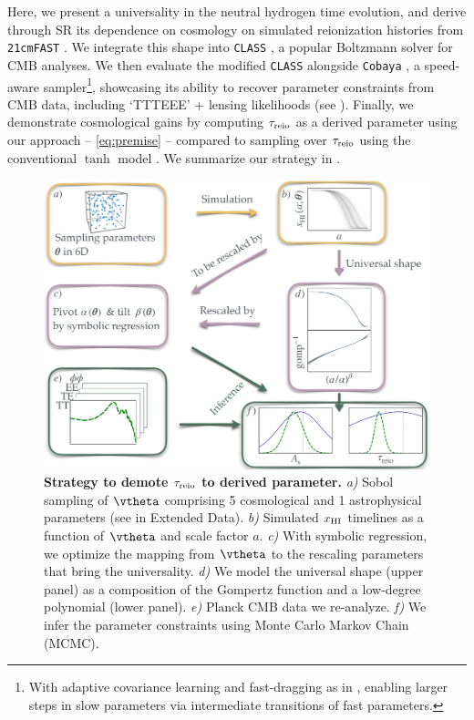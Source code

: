 Here, we present a universality in the neutral hydrogen time evolution,
and derive through SR its dependence on cosmology on simulated
reionization histories from \texttt{21cmFAST} \cite{MesingerEtAl2011,
Murray2020}.
We integrate this shape into \texttt{CLASS} \cite{Blas2011}, a popular
Boltzmann solver for CMB analyses.
We then evaluate the modified \texttt{CLASS} alongside \texttt{Cobaya}
\cite{Torrado2020}, a speed-aware sampler\cite{Lewis2002,
Lewis2013}\footnote{With adaptive covariance learning and fast-dragging
as in \cite{Neal2005}, enabling larger steps in slow parameters via
intermediate transitions of fast parameters.}, showcasing its ability to
recover parameter constraints from CMB data, including `TTTEEE' +
lensing likelihoods \cite{Planck2020c, Planck2020d} (see ).
Finally, we demonstrate cosmological gains by computing $\tau_{\mathrm{reio}}$ as
a derived parameter using our approach -- \cref{eq:premise} --
compared to sampling over $\tau_{\mathrm{reio}}$ using the conventional $\tanh$
model \cite{Lewis2008}.
We summarize our strategy in .

\begin{figure}[tb]
\centering
\includegraphics[width=\linewidth]{figs/big_fig.pdf}
\caption{\textbf{Strategy to demote $\tau_{\mathrm{reio}}$ to derived parameter.}
\emph{a)} Sobol sampling of $\vtheta$ comprising 5 cosmological and 1
astrophysical parameters (see  in Extended Data).
\emph{b)} Simulated $x_{\mathrm{HI}}$ timelines as a function of $\vtheta$ and
scale factor $a$.
\emph{c)} With symbolic regression, we optimize the mapping from
$\vtheta$ to the rescaling parameters that bring the universality.
\emph{d)} We model the universal shape (upper panel) as a composition of
the Gompertz function and a low-degree polynomial (lower panel).
\emph{e)} Planck CMB data we re-analyze.
\emph{f)} We infer the parameter constraints using Monte Carlo Markov
Chain (MCMC).}
\label{fig:big}
\end{figure}


